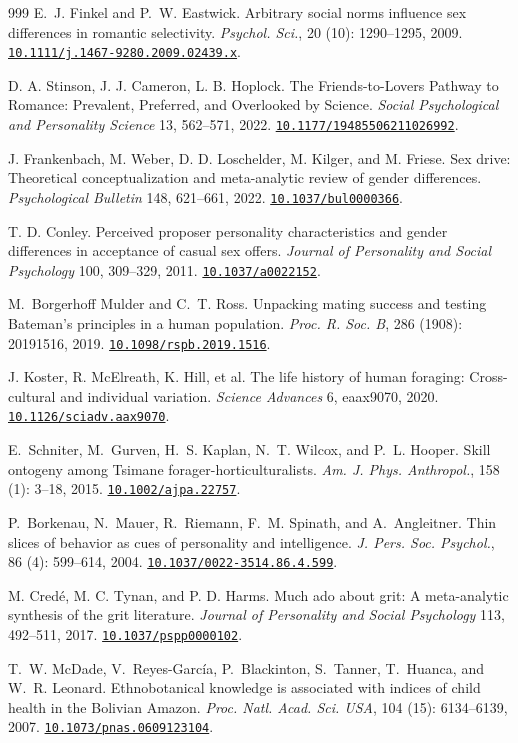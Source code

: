 \documentclass[10pt,twocolumn,letterpaper]{article}
\newcommand{\doi}[1]{\href{https://doi.org/#1}{\nolinkurl{#1}}}
\begin{document}
\begin{thebibliography}{999}
 E.~J. {Finkel} and P.~W. {Eastwick}. {Arbitrary social norms influence sex differences in romantic selectivity}. \emph{Psychol. Sci.}, 20 (10): 1290--1295, 2009. \doi{10.1111/j.1467-9280.2009.02439.x}.

 D. A. Stinson, J. J. Cameron, L. B. Hoplock. The Friends-to-Lovers Pathway to Romance: Prevalent, Preferred, and Overlooked by Science. \emph{Social Psychological and Personality Science} 13, 562--571, 2022. \doi{10.1177/19485506211026992}.

 J. Frankenbach, M. Weber, D. D. Loschelder, M. Kilger, and M. Friese. Sex drive: Theoretical conceptualization and meta-analytic review of gender differences. \emph{Psychological Bulletin} 148, 621--661, 2022. \doi{10.1037/bul0000366}.

 T. D. Conley. Perceived proposer personality characteristics and gender differences in acceptance of casual sex offers. \emph{Journal of Personality and Social Psychology} 100, 309--329, 2011. \doi{10.1037/a0022152}.

 M.~{Borgerhoff Mulder} and C.~T. {Ross}. {Unpacking mating success and testing Bateman's principles in a human population}. \emph{Proc. R. Soc. B}, 286 (1908): 20191516, 2019. \doi{10.1098/rspb.2019.1516}.

 J. Koster, R. McElreath, K. Hill, et al. The life history of human foraging: Cross-cultural and individual variation. \emph{Science Advances} 6, eaax9070, 2020. \doi{10.1126/sciadv.aax9070}.

 E.~{Schniter}, M.~{Gurven}, H.~S. {Kaplan}, N.~T. {Wilcox}, and P.~L. {Hooper}. {Skill ontogeny among Tsimane forager-horticulturalists}. \emph{Am. J. Phys. Anthropol.}, 158 (1): 3--18, 2015. \doi{10.1002/ajpa.22757}.

 P.~{Borkenau}, N.~{Mauer}, R.~{Riemann}, F.~M. {Spinath}, and A.~{Angleitner}. {Thin slices of behavior as cues of personality and intelligence}. \emph{J. Pers. Soc. Psychol.}, 86 (4): 599--614, 2004. \doi{10.1037/0022-3514.86.4.599}.

 M. Cred\'e, M. C. Tynan, and P. D. Harms. Much ado about grit: A meta-analytic synthesis of the grit literature. \emph{Journal of Personality and Social Psychology} 113, 492--511, 2017. \doi{10.1037/pspp0000102}.

 T.~W. {McDade}, V.~{Reyes-García}, P.~{Blackinton}, S.~{Tanner}, T.~{Huanca}, and W.~R. {Leonard}. {Ethnobotanical knowledge is associated with indices of child health in the Bolivian Amazon}. \emph{Proc. Natl. Acad. Sci. USA}, 104 (15): 6134--6139, 2007. \doi{10.1073/pnas.0609123104}.


\end{thebibliography}
\end{document}
